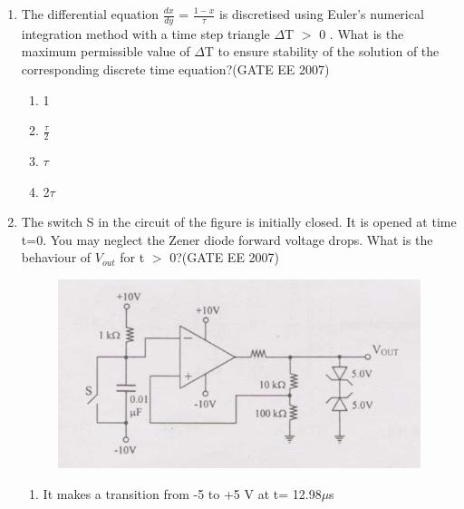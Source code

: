 \documentclass[a4paper,10pt]{exam}
\theoremstyle{remark}
\begin{document}
\begin{enumerate}
\begin{figure}[!ht]
\end{figure}
\begin{multicols}{4}
\begin{enumerate}
 \item S is always either zero or odd
\item S is always either zero or even
\item  s = 1 only if the sum of A, B, C and D is even 
\item s = 1 only if the sum of A, B, C and D is odd
\end{enumerate}
\end{multicols}
\vspace{0.5cm}
\item  The differential equation $\frac{dx}{dy}$ = $\frac{1-x}{\tau}$ is discretised using Euler's numerical integration method with a time step triangle $\Delta$T $>$  0 . What is the maximum permissible value of $\Delta$T to ensure stability of the solution of the corresponding discrete time equation?\hfill{(GATE EE 2007)} 
\begin{multicols}{4}
\begin{enumerate}
 \item 1
\item $\frac{\tau}{2}$
\item $\tau$
\item 2$\tau$
\end{enumerate}
\end{multicols}

\item  The switch S in the circuit of the figure is initially closed. It is opened at time t=0. You may neglect the Zener diode forward voltage drops. What is the behaviour of $V_{out}$ for t $>$ 0?\hfill{(GATE EE 2007)} 

\begin{figure}[H]
    \centering
    \includegraphics[width=0.5\linewidth]{figs/Q24 2007.png}
   
\end{figure}

\begin{enumerate}
 \item  It makes a transition from -5 to +5 V at t= 12.98$\mu$s


\end{enumerate}
\end{enumerate}
\end{document}
